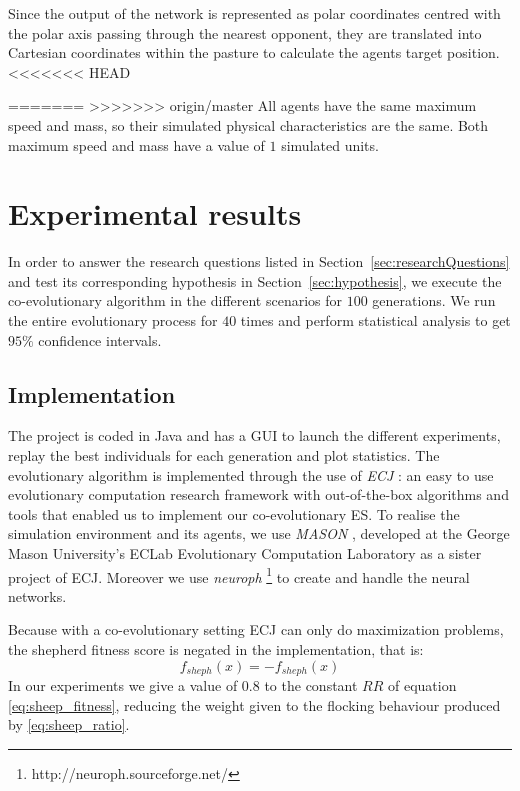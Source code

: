 \documentclass[conference]{IEEEtran}
\begin{document}
Since the output of the network is represented as polar coordinates centred with the polar axis passing through the nearest opponent, they are translated into Cartesian coordinates within the pasture to calculate the agents target position.
<<<<<<< HEAD

=======
>>>>>>> origin/master
All agents have the same maximum speed and mass, so their simulated physical characteristics are the same.
Both maximum speed and mass have a value of $1$ simulated units.



\section{Experimental results}
\label{sec:experiment}
In order to answer the research questions listed in {Section~\ref{sec:researchQuestions}} and test its corresponding hypothesis in {Section~\ref{sec:hypothesis}}, we execute the co-evolutionary algorithm in the different scenarios for $100$ generations. 
We run the entire evolutionary process for $40$ times and perform statistical analysis to get $95\%$ confidence intervals.

\subsection{Implementation}
\label{sec:implementation}
The project is coded in Java and has a GUI to launch the different experiments, replay the best individuals for each generation and plot statistics.
The evolutionary algorithm is implemented through the use of \textit{ECJ} \cite{luke2006ecj}: an easy to use evolutionary computation research framework with out-of-the-box algorithms and tools that enabled us to implement our co-evolutionary ES.
To realise the simulation environment and its agents, we use \textit{MASON} \cite{luke2005mason}, developed at the George Mason University's ECLab Evolutionary Computation Laboratory as a sister project of ECJ.
Moreover we use \textit{neuroph} \footnote{http://neuroph.sourceforge.net/} to create and handle the neural networks.

Because with a co-evolutionary setting ECJ can only do maximization problems, the shepherd fitness score is negated in the implementation, that is:
$$ f_{sheph}(x) = -f_{sheph}(x) $$
In our experiments we give a value of $0.8$ to the constant $RR$ of equation \eqref{eq:sheep_fitness}, reducing the weight given to the flocking behaviour produced by \eqref{eq:sheep_ratio}.
\end{document}
